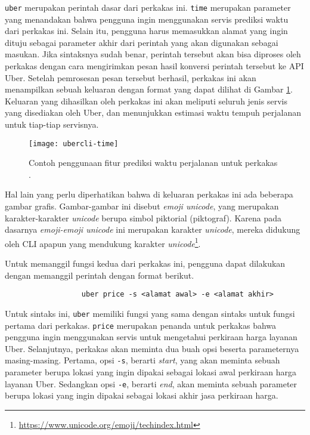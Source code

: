 \verb|uber| merupakan perintah dasar dari perkakas ini. \verb|time| merupakan parameter yang menandakan bahwa pengguna ingin menggunakan servis prediksi waktu dari perkakas ini. Selain itu, pengguna harus memasukkan alamat yang ingin dituju sebagai parameter akhir dari perintah yang akan digunakan sebagai masukan. Jika sintaksnya sudah benar, perintah tersebut akan bisa diproses oleh perkakas dengan cara mengirimkan pesan hasil konversi perintah tersebut ke API Uber. Setelah pemrosesan pesan tersebut berhasil, perkakas ini akan menampilkan sebuah keluaran dengan format yang dapat dilihat di Gambar \ref{fig:similarapps-ubercli-time}. Keluaran yang dihasilkan oleh perkakas ini akan meliputi seluruh jenis servis yang disediakan oleh Uber, dan menunjukkan estimasi waktu tempuh perjalanan untuk tiap-tiap servisnya.
\vspace*{1em} %
\begin{figure}[h]
    \centering
    \texttt{[image: ubercli-time]}
    \caption[Contoh penggunaan perkakas \ubercli\xspace (\textit{time})]{Contoh penggunaan fitur prediksi waktu perjalanan untuk perkakas \ubercli.\protect\footnotemark}
    \label{fig:similarapps-ubercli-time}
\end{figure}
\newpage %
Hal lain yang perlu diperhatikan bahwa di keluaran perkakas ini ada beberapa gambar grafis. Gambar-gambar ini disebut \textit{emoji unicode}, yang merupakan karakter-karakter \textit{unicode} berupa simbol piktorial (piktograf). Karena pada dasarnya \textit{emoji-emoji unicode} ini merupakan karakter \textit{unicode}, mereka didukung oleh CLI apapun yang mendukung karakter \textit{unicode}\footnote{\href{https://www.unicode.org/emoji/techindex.html}{https://www.unicode.org/emoji/techindex.html}}.

Untuk memanggil fungsi kedua dari perkakas ini, pengguna dapat dilakukan dengan memanggil perintah dengan format berikut.
\vspace{0.25em} %
\begin{verbatim}
                  uber price -s <alamat awal> -e <alamat akhir>
\end{verbatim}
\vspace{0.25em} %
Untuk sintaks ini, \verb|uber| memiliki fungsi yang sama dengan sintaks untuk fungsi pertama dari perkakas. \verb|price| merupakan penanda untuk perkakas bahwa pengguna ingin menggunakan servis untuk mengetahui perkiraan harga layanan Uber. Selanjutnya, perkakas akan meminta dua buah opsi beserta parameternya masing-masing. Pertama, opsi \verb|-s|, berarti \textit{start}, yang akan meminta sebuah parameter berupa lokasi yang ingin dipakai sebagai lokasi awal perkiraan harga layanan Uber. Sedangkan opsi \verb|-e|, berarti \textit{end}, akan meminta sebuah parameter berupa lokasi yang ingin dipakai sebagai lokasi akhir jasa perkiraan harga.

